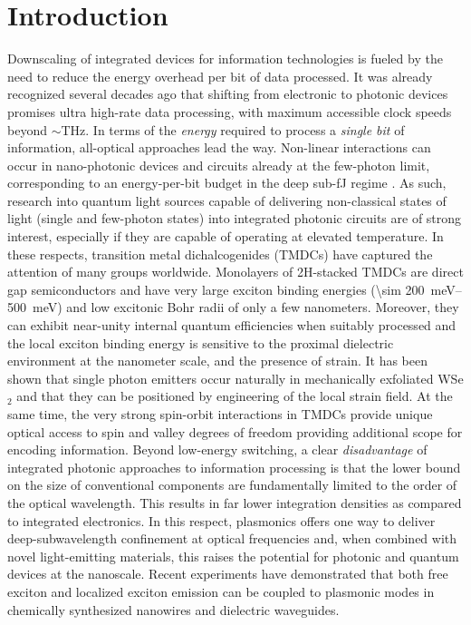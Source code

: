 \documentclass[journal=nalefd,manuscript=letter]{achemso}
\begin{document}
\section{Introduction}
Downscaling of integrated devices for information technologies is fueled by the need to reduce the energy overhead per bit of data processed.\cite{Schaller.1997,Ha.,Wu.,Kish.2002}
It was already recognized several decades ago that shifting from electronic to photonic devices\cite{Ozbay.2006,Sorger.2012} promises ultra high-rate data processing, with maximum accessible clock speeds beyond $\sim$THz\cite{Heuring.1992}.
In terms of the \textit{energy} required to process a \textit{single bit} of information, all-optical approaches lead the way. Non-linear interactions can occur in nano-photonic devices and circuits already at the few-photon limit, corresponding to an energy-per-bit budget in the deep sub-fJ regime \cite{Nozaki.2010}.
As such, research into quantum light sources capable of delivering non-classical states of light (single and few-photon states)\cite{Aharonovich.2016} into integrated photonic circuits are of strong interest, especially if they are capable of operating at elevated temperature.
In these respects, transition metal dichalcogenides (TMDCs) have captured the attention of many groups worldwide.
Monolayers of 2H-stacked TMDCs are direct gap semiconductors\cite{Splendiani.2010,Mak.2010} and have very large exciton binding energies (\SIrange{\sim 200}{500}{\milli\electronvolt}) and low excitonic Bohr radii of only a few nanometers\cite{Ugeda.2014,Chernikov.2014}.
Moreover, they can exhibit near-unity internal quantum efficiencies when suitably processed\cite{Amani.2015} and the local exciton binding energy is sensitive to the proximal dielectric environment at the nanometer scale\cite{Roesner.2016}, and the presence of strain\cite{Tonndorf.2015}.
It has been shown that single photon emitters occur naturally in mechanically exfoliated WSe$_2$ \cite{Chakraborty.2015,He.2015,Koperski.2015,Srivastava.2015,Tonndorf.2015} and that they can be positioned by engineering of the local strain field\cite{Kern.2016,PalaciosBerraquero.2017,Branny.}.
At the same time, the very strong spin-orbit interactions in TMDCs provide unique optical access to spin and valley degrees of freedom \cite{DiXiao.2012,Cao.2012,Mak.2012,Zeng.2012,Sallen.2012} providing additional scope for encoding information.
Beyond low-energy switching, a clear \textit{disadvantage} of integrated photonic approaches to information processing is that the lower bound on the size of conventional components are fundamentally limited to the order of the optical wavelength\cite{Born.2016}.
This results in far lower integration densities as compared to integrated electronics.
In this respect, plasmonics offers one way to deliver deep-subwavelength confinement at optical frequencies \cite{Ozbay.2006} and, when combined with novel light-emitting materials, this raises the potential for photonic and quantum devices at the nanoscale.
Recent experiments have demonstrated that both free exciton \cite{Goodfellow.2014,Lee.2015,Zhu.2016} and localized exciton \cite{Cai.2017} emission can be coupled to plasmonic modes in chemically synthesized nanowires and dielectric waveguides\cite{Tonndorf.2017}.
\end{document}
